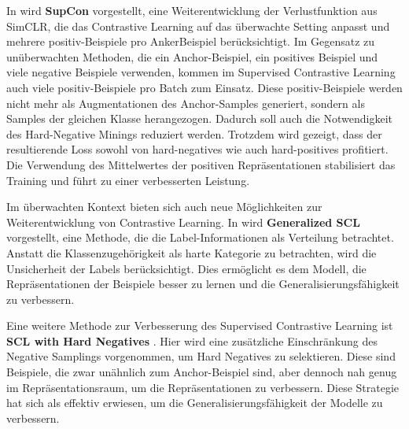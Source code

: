 In \parencite{Khosla2021supcon} wird \textbf{SupCon} vorgestellt, eine Weiterentwicklung der Verlustfunktion aus SimCLR, die das Contrastive Learning auf das überwachte Setting anpasst und mehrere positiv-Beispiele pro AnkerBeispiel berücksichtigt. Im Gegensatz zu unüberwachten Methoden, die ein Anchor-Beispiel, ein positives Beispiel und viele negative Beispiele verwenden, kommen im Supervised Contrastive Learning auch viele positiv-Beispiele pro Batch zum Einsatz. Diese positiv-Beispiele werden nicht mehr als Augmentationen des Anchor-Samples generiert, sondern als Samples der gleichen Klasse herangezogen. Dadurch soll auch die Notwendigkeit des Hard-Negative Minings reduziert werden. Trotzdem wird gezeigt, dass der resultierende Loss sowohl von hard-negatives wie auch hard-positives profitiert. Die Verwendung des Mittelwertes der positiven Repräsentationen stabilisiert das Training und führt zu einer verbesserten Leistung.

Im überwachten Kontext bieten sich auch neue Möglichkeiten zur Weiterentwicklung von Contrastive Learning. In \parencite{Kim2023generalizedsupcon} wird \textbf{Generalized SCL} vorgestellt, eine Methode, die die Label-Informationen als Verteilung betrachtet. Anstatt die Klassenzugehörigkeit als harte Kategorie zu betrachten, wird die Unsicherheit der Labels berücksichtigt. Dies ermöglicht es dem Modell, die Repräsentationen der Beispiele besser zu lernen und die Generalisierungsfähigkeit zu verbessern.

Eine weitere Methode zur Verbesserung des Supervised Contrastive Learning ist \textbf{SCL with Hard Negatives} \parencite{Jiang2024supconhardnegatives}. Hier wird eine zusätzliche Einschränkung des Negative Samplings vorgenommen, um Hard Negatives zu selektieren. Diese sind Beispiele, die zwar unähnlich zum Anchor-Beispiel sind, aber dennoch nah genug im Repräsentationsraum, um die Repräsentationen zu verbessern. Diese Strategie hat sich als effektiv erwiesen, um die Generalisierungsfähigkeit der Modelle zu verbessern.

